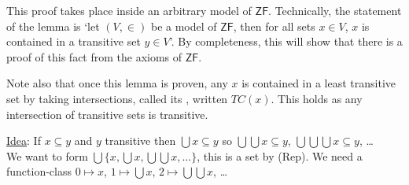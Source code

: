 \begin{remark}
    This proof takes place inside an arbitrary model of $\mathsf{ZF}$.
    Technically, the statement of the lemma is `let $(V, \in)$ be a model of $\mathsf{ZF}$, then for all sets $x \in V$, $x$ is contained in a transitive set $y \in V$'.
    By completeness, this will show that there is a proof of this fact from the axioms of $\mathsf{ZF}$.

    Note also that once this lemma is proven, any $x$ is contained in a least transitive set by taking intersections, called its , written $TC(x)$.
    This holds as any intersection of transitive sets is transitive.
\end{remark}

\underline{Idea}: If $x \subseteq y$ and $y$ transitive then $\bigcup x \subseteq y$ so $\bigcup \bigcup x \subseteq y$, $\bigcup \bigcup \bigcup x \subseteq y$, \dots \\
We want to form $\bigcup \{x, \bigcup x, \bigcup \bigcup x, \dots\}$, this is a set by (Rep).
We need a function-class $0 \mapsto x$, $1 \mapsto \bigcup x$, $2 \mapsto \bigcup \bigcup x$, \dots


